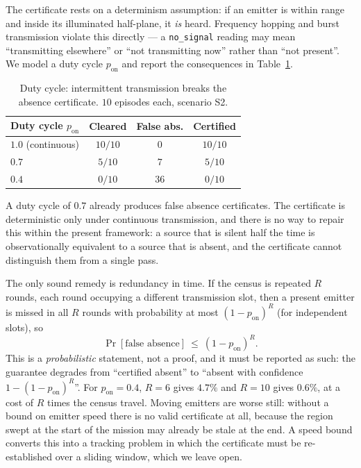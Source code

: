 \documentclass[preprint,12pt,3p]{elsarticle}
\theoremstyle{definition}
\begin{document}
The certificate rests on a determinism assumption: if an emitter is within range and inside its
illuminated half-plane, it \emph{is} heard. Frequency hopping and burst transmission violate this
directly --- a \texttt{no\_signal} reading may mean ``transmitting elsewhere'' or ``not
transmitting now'' rather than ``not present''. We model a duty cycle $p_{\mathrm{on}}$ and report
the consequences in Table~\ref{tab:duty}.

\begin{table}[t]
\caption{Duty cycle: intermittent transmission breaks the absence certificate. $10$ episodes each,
scenario S2.}
\label{tab:duty}
\centering
\small
\begin{tabular}{lccc}
\toprule
Duty cycle $p_{\mathrm{on}}$ & Cleared & \textbf{False abs.} & Certified \\
\midrule
$1.0$ (continuous) & $10/10$ & $0$  & $10/10$ \\
$0.7$              & $5/10$  & $7$  & $5/10$ \\
$0.4$              & $0/10$  & $36$ & $0/10$ \\
\bottomrule
\end{tabular}
\end{table}

A duty cycle of $0.7$ already produces false absence certificates. The certificate is
deterministic only under continuous transmission, and there is no way to repair this within the
present framework: a source that is silent half the time is observationally equivalent to a
source that is absent, and the certificate cannot distinguish them from a single pass.

The only sound remedy is redundancy in time. If the census is repeated $R$ rounds, each round
occupying a different transmission slot, then a present emitter is missed in all $R$ rounds with
probability at most $(1-p_{\mathrm{on}})^R$ (for independent slots), so
\begin{equation}
\Pr[\text{false absence}]\ \le\ (1-p_{\mathrm{on}})^R .
\label{eq:rounds}
\end{equation}
This is a \emph{probabilistic} statement, not a proof, and it must be reported as such: the
guarantee degrades from ``certified absent'' to ``absent with confidence $1-(1-p_{\mathrm{on}})^R$''.
For $p_{\mathrm{on}}=0.4$, $R=6$ gives $4.7\%$ and $R=10$ gives $0.6\%$, at a cost of $R$ times
the census travel. Moving emitters are worse still: without a bound on emitter speed there is no
valid certificate at all, because the region swept at the start of the mission may already be
stale at the end. A speed bound converts this into a tracking problem in which the certificate
must be re-established over a sliding window, which we leave open.
\end{document}
